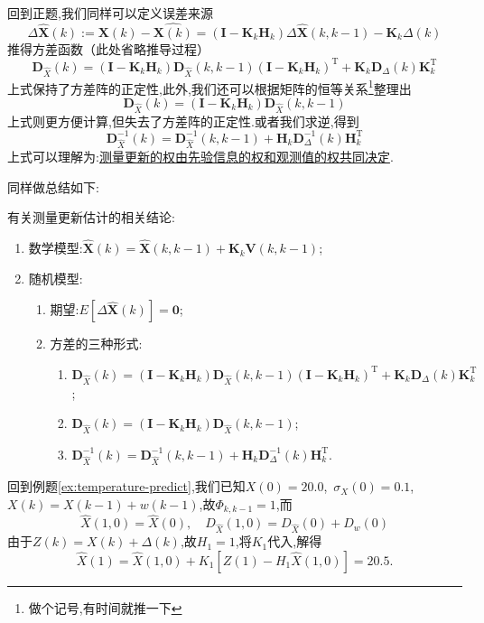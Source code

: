 \documentclass[cn,10pt,citestyle=gb7714-2015,bibstyle=gb7714-2015]{elegantbook}
\newcommand{\mT}{\mathrm{T}}
\begin{document}
回到正题,我们同样可以定义误差来源
\begin{equation}
  \Delta\hat{\bm{X}}(k):=\bm{X}(k)-\hat{\bm{X}(k)}=(\bm{I}-\bm{K}_k\bm{H}_k)\Delta\hat{\bm{X}}(k,k-1)-\bm{K}_k\bm{\varDelta}(k)
\end{equation}
推得方差函数（此处省略推导过程）
\begin{equation}
  \bm{D}_{\hat{X}}(k)=(\bm{I}-\bm{K}_k\bm{H}_k)\bm{D}_{\hat{X}}(k,k-1)(\bm{I}-\bm{K}_k\bm{H}_k)^\mT+\bm{K}_k\bm{D}_{\varDelta}(k)\bm{K}_k^\mT
\end{equation}
上式保持了方差阵的正定性,此外,我们还可以根据矩阵的恒等关系\footnote{做个记号,有时间就推一下}整理出
\begin{equation}
  \bm{D}_{\hat{X}}(k)=(\bm{I}-\bm{K}_k\bm{H}_k)\bm{D}_{\hat{X}}(k,k-1)
\end{equation}
上式则更方便计算,但失去了方差阵的正定性.或者我们求逆,得到
\begin{equation}
  \bm{D}_{\hat{X}}^{-1}(k)=\bm{D}_{\hat{X}}^{-1}(k,k-1)+\bm{H}_k\bm{D}_{\varDelta}^{-1}(k)\bm{H}_k^\mT
\end{equation}
上式可以理解为:\uline{测量更新的权由先验信息的权和观测值的权共同决定}.

同样做总结如下:
\begin{conclusion}
  有关测量更新估计的相关结论:
  \begin{enumerate}
    \item 数学模型:$\displaystyle \hat{\bm{X}}(k)=\hat{\bm{X}}(k,k-1)+\bm{K}_k\bm{V}(k,k-1)$;
    \item 随机模型:
    \begin{enumerate}
      \item 期望:$\displaystyle E[\Delta\bm{\hat{X}}(k)]=\bm{0}$;
      \item 方差的三种形式:
      \begin{enumerate}
      \item $\displaystyle \bm{D}_{\hat{X}}(k)=(\bm{I}-\bm{K}_k\bm{H}_k)\bm{D}_{\hat{X}}(k,k-1)(\bm{I}-\bm{K}_k\bm{H}_k)^\mT+\bm{K}_k\bm{D}_{\varDelta}(k)\bm{K}_k^\mT$;
      \item $\displaystyle \bm{D}_{\hat{X}}(k)=(\bm{I}-\bm{K}_k\bm{H}_k)\bm{D}_{\hat{X}}(k,k-1)$;
      \item $\displaystyle \bm{D}_{\hat{X}}^{-1}(k)=\bm{D}_{\hat{X}}^{-1}(k,k-1)+\bm{H}_k\bm{D}_{\varDelta}^{-1}(k)\bm{H}_k^\mT$.
      \end{enumerate}
    \end{enumerate}
  \end{enumerate}
\end{conclusion}
回到例题\ref{ex:temperature-predict},我们已知$X(0)=20.0$,\ $\sigma_X(0)=0.1$,\ $X(k)=X(k-1)+w(k-1)$,故$\varPhi_{k,k-1}=1$,而
\[
    \hat{X}(1,0)=\hat{X}(0),\quad D_{\hat{X}}(1,0)=D_{\hat{X}}(0)+D_w(0)
\]
由于$Z(k)=X(k)+\varDelta(k)$,故$H_1=1$,将$K_1$代入,解得
\[
    \hat{X}(1)=\hat{X}(1,0)+K_1[Z(1)-H_1\hat{X}(1,0)]=20.5.
\]
\end{document}
